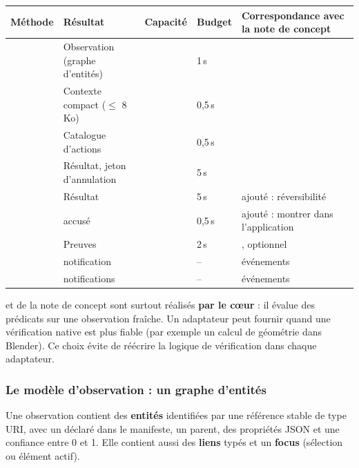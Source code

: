 {\small\setlength{\tabcolsep}{4pt}
\begin{xltabular}{\textwidth}{@{}L{3.7cm}L{3.0cm}L{2.0cm}L{0.9cm}Y@{}}
\toprule
\textbf{Méthode} & \textbf{Résultat} & \textbf{Capacité} & \textbf{Budget} & \textbf{Correspondance avec la note de concept} \\
\midrule
{} & Observation (graphe d'entités) &  & 1\,s &  \\
 & Contexte compact ($\leq$ 8\,Ko) &  & 0,5\,s &  \\
 & Catalogue d'actions &  & 0,5\,s &  \\
 & Résultat, jeton d'annulation &  & 5\,s &  \\
 & Résultat &  & 5\,s & ajouté : réversibilité \\
 & accusé &  & 0,5\,s & ajouté : montrer dans l'application \\
 & Preuves &  & 2\,s & , optionnel \\
 & notification &  & -- & événements \\
\newline {}\newline {} & notifications &  & -- & événements \\
\bottomrule
\end{xltabular}}

 et  de la note de concept sont surtout réalisés \textbf{par le cœur} : il évalue des prédicats sur une observation fraîche. Un adaptateur peut fournir  quand une vérification native est plus fiable (par exemple un calcul de géométrie dans Blender). Ce choix évite de réécrire la logique de vérification dans chaque adaptateur.

\subsubsection{Le modèle d'observation : un graphe d'entités}

Une observation contient des \textbf{entités} identifiées par une référence stable de type URI, avec un  déclaré dans le manifeste, un parent, des propriétés JSON et une confiance entre 0 et 1. Elle contient aussi des \textbf{liens} typés et un \textbf{focus} (sélection ou élément actif).

